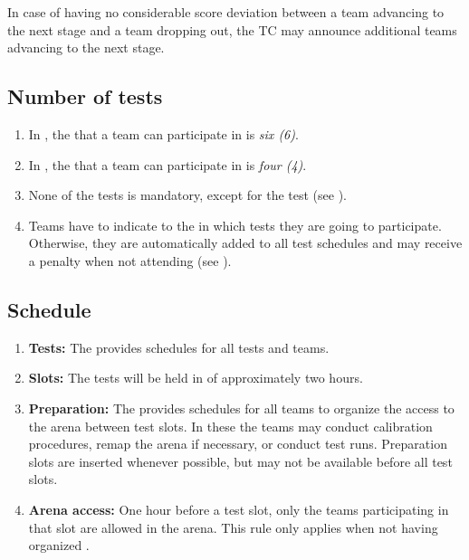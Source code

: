 In case of having no considerable score deviation between a team advancing to the next stage and a team dropping out, the TC may announce additional teams advancing to the next stage.


\subsection{Number of tests}\label{rule:number_of_tests}

\begin{enumerate}
	\item In , the  that a team can participate in is \emph{six (6)}.
	\item In , the  that a team can participate in is \emph{four (4)}.
	\item None of the tests is mandatory, except for the  test (see ). %
	\item Teams have to indicate to the  in which tests they are going to participate. Otherwise, they are automatically added to all test schedules and may receive a penalty when not attending (see ).
\end{enumerate}


\subsection{Schedule}
\label{rule:schedule}

\begin{enumerate}
	\item \textbf{Tests:} The  provides schedules for all tests and teams. 
	\item \textbf{Slots:} The tests will be held in  of approximately two hours.
	\item \textbf{Preparation:} The  provides schedules for all teams to organize the access to the arena between test slots. In these  the teams may conduct calibration procedures, remap the arena if necessary, or conduct test runs.
	Preparation slots are inserted whenever possible, but may not be available before all test slots. 
	\item \textbf{Arena access:} One hour before a test slot, only the teams participating in that slot are allowed in the arena.
This rule only applies when not having organized .   
\end{enumerate}


